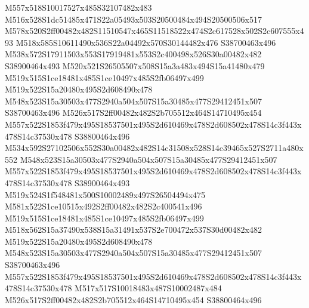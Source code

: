 \documentclass{article}
\begin{document}
\begin{multicols}{2}
M557x518S10017527x485S32107482x483 M516x528S1dc51485x471S22a05493x503S20500484x494S20500506x517 M578x520S2ff00482x482S11510547x465S11518522x474S2c617528x502S2c607555x493 M518x585S10611490x536S22a04492x570S30144482x476 S38700463x496 M538x572S17911503x553S17919481x553S2c400498x526S30a00482x482 S38900464x493 M520x521S26505507x508S15a3a483x494S15a41480x479 M519x515S1ce18481x485S1ce10497x485S2fb06497x499 M519x522S15a20480x495S2d608490x478 M548x523S15a30503x477S2940a504x507S15a30485x477S29412451x507 S38700463x496 M526x517S2ff00482x482S2b705512x464S14710495x454 M557x522S1853f479x495S18537501x495S2d610469x478S2d608502x478S14c3f443x478S14c37530x478 S38800464x496 M534x592S27102506x552S30a00482x482S14c31508x528S14c39465x527S2711a480x552 M548x523S15a30503x477S2940a504x507S15a30485x477S29412451x507 M557x522S1853f479x495S18537501x495S2d610469x478S2d608502x478S14c3f443x478S14c37530x478 S38900464x493 M519x524S1f548481x500S10002489x497S26504494x475 M581x522S1ce10515x492S2ff00482x482S2c400541x496 M519x515S1ce18481x485S1ce10497x485S2fb06497x499 M518x562S15a37490x538S15a31491x537S2e700472x537S30d00482x482 M519x522S15a20480x495S2d608490x478 M548x523S15a30503x477S2940a504x507S15a30485x477S29412451x507 S38700463x496 M557x522S1853f479x495S18537501x495S2d610469x478S2d608502x478S14c3f443x478S14c37530x478 M517x517S10018483x487S10002487x484 M526x517S2ff00482x482S2b705512x464S14710495x454 S38800464x496










\end{multicols}
\end{document}
